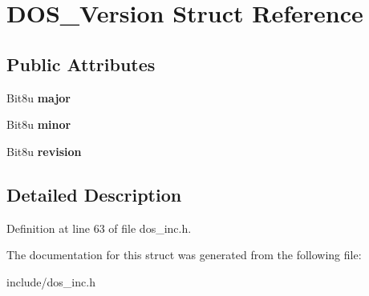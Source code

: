 \hypertarget{structDOS__Version}{\section{D\-O\-S\-\_\-\-Version Struct Reference}
\label{structDOS__Version}
}
\subsection*{Public Attributes}
\begin{DoxyCompactItemize}
\item 
\hypertarget{structDOS__Version_a4f4d937db09f1eb1c063524e9d1c7e7d}{Bit8u {\bfseries major}}\label{structDOS__Version_a4f4d937db09f1eb1c063524e9d1c7e7d}

\item 
\hypertarget{structDOS__Version_a2b1d5692b3534f25d253e342e3542334}{Bit8u {\bfseries minor}}\label{structDOS__Version_a2b1d5692b3534f25d253e342e3542334}

\item 
\hypertarget{structDOS__Version_a833c64ae97ff8a50ea326a9ef17f345a}{Bit8u {\bfseries revision}}\label{structDOS__Version_a833c64ae97ff8a50ea326a9ef17f345a}

\end{DoxyCompactItemize}


\subsection{Detailed Description}


Definition at line 63 of file dos\-\_\-inc.\-h.



The documentation for this struct was generated from the following file\-:\begin{DoxyCompactItemize}
\item 
include/dos\-\_\-inc.\-h\end{DoxyCompactItemize}
